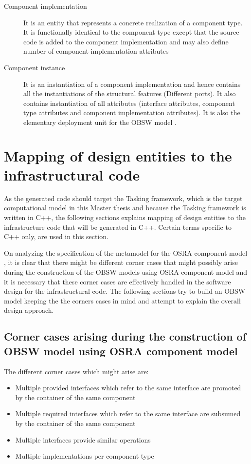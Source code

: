 \begin{description}
\item [Component implementation] It is an entity that represents a concrete realization of a component type. It is functionally identical to the component type except that the source code is added to the component implementation and may also define number of component implementation attributes

\item [Component instance] It is an instantiation of a component implementation and hence contains all the instantiations of the structural features (Different ports). It also contains instantiation of all attributes (interface attributes, component type attributes and component implementation attributes). It is also the elementary deployment unit for the OBSW model \cite{SpecMetamodel}.        
\end{description}

\section{Mapping of design entities to the infrastructural code}
As the generated code should target the Tasking framework, which is the target computational model in this Master thesis and because the Tasking framework is written in C++, the following sections explains mapping of design entities to the infrastructure code that will be generated in C++. Certain terms specific to C++ only, are used in this section.

On analyzing the specification of the metamodel for the OSRA component model \cite{SpecMetamodel}, it is clear that there might be different corner cases that might possibly arise during the construction of the OBSW models using OSRA component model and it is necessary that these corner cases are effectively handled in the software design for the infrastructural code. The following sections try to build an OBSW model keeping the the corners cases in mind and attempt to explain the overall design approach.

\subsection{Corner cases arising during the construction of OBSW model using OSRA component model}
The different corner cases which might arise are:

\begin{itemize}
\item Multiple provided interfaces which refer to the same interface are promoted by the container of the same component
\item Multiple required interfaces which refer to the same interface are subsumed by the container of the same component
\item Multiple interfaces provide similar operations
\item Multiple implementations per component type
\end{itemize}

